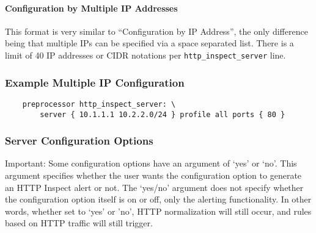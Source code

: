 \documentclass[english]{report}
\begin{document}
\paragraph{Configuration by Multiple IP Addresses}

This format is very similar to ``Configuration by IP Address'', the only
difference being that multiple IPs can be specified via a space separated list.
There is a limit of 40 IP addresses or CIDR notations per
\texttt{http\_inspect\_server} line.

\subsubsection{Example Multiple IP Configuration}

\begin{verbatim}
    preprocessor http_inspect_server: \
        server { 10.1.1.1 10.2.2.0/24 } profile all ports { 80 }
\end{verbatim}

\subsubsection{Server Configuration Options}

Important: Some configuration options have an argument of `yes' or `no'.  This
argument specifies whether the user wants the configuration option to generate
an HTTP Inspect alert or not.  The `yes/no' argument does not specify whether
the configuration option itself is on or off, only the alerting functionality.
In other words, whether set to `yes' or 'no', HTTP normalization will still
occur, and rules based on HTTP traffic will still trigger.
\end{document}
